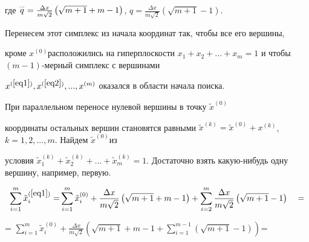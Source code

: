 \documentclass [12pt]{article}
\begin{document}
\noindent

где $\mathord{\buildrel{\lower3pt\hbox{$\scriptscriptstyle\frown$}}\over 

{q}} = \frac{\Delta x}{m\sqrt 2 }\left( {\sqrt {m + 1} + m - 1} \right)$, $q 

= \frac{\Delta x}{m\sqrt 2 }\left( {\sqrt {m + 1} - 1} \right)$.



Перенесем этот симплекс из начала координат так, чтобы все его вершины, 

кроме $x^{(0)}_{ }$расположились на гиперплоскости $x_1 + x_2 + ... + x_m 

= 1$ и чтобы $(m - 1)$-мерный симплекс с вершинами 

$x^{(\ref{eq1})},x^{(\ref{eq2})},...,x^{(m)}$ оказался в области начала поиска. 



При параллельном переносе нулевой вершины в точку $\tilde {x}^{(0)}$ 

координаты остальных вершин становятся равными $\tilde {x}^{(k)} = \tilde 

{x}^{(0)} + x^{(k)}$, $k = 1,2,...,m$. Найдем $\tilde {x}^{(0)}_{ }$из 

условия $\tilde {x}_1^{(k)} + \tilde {x}_2^{(k)} + ... + \tilde {x}_m^{(k)} 

= 1$. Достаточно взять какую-нибудь одну вершину, например, первую. 





\[

\sum\limits_{i = 1}^m {\tilde {x}_i^{(\ref{eq1})} = } 

\sum\limits_{i = 1}^m {\tilde {x}_i^{(0)} } 

 + \frac{\Delta x}{m\sqrt 2 }\left( {\sqrt {m + 1} + m - 1} \right)

 + \sum\limits_{i = 2}^m {\frac{\Delta x}{m\sqrt 2 }\left( {\sqrt {m + 1} - 

1} \right)} \quad = 

\]







\begin{center}

= $\sum\limits_{i = 1}^m {\tilde {x}_i^{(0)} }  + \frac{\Delta x}{m\sqrt 2 

}\left( {\sqrt {m + 1} + m - 1 + \sum\limits_{i = 1}^{m - 1} {\left( {\sqrt 

{m + 1} - 1} \right)} } \right)_{ }$=

\end{center}
\end{document}
